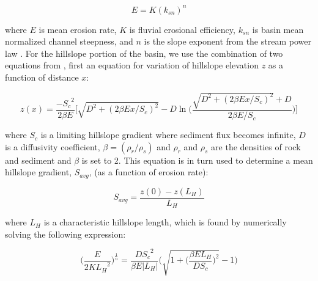 \begin{equation} \label{eq:EroK}
E=K(k_{sn})^{n}
\end{equation}

\noindent
where $E$ is mean erosion rate, $K$ is fluvial erosional efficiency, $k_{sn}$ is basin mean normalized channel steepness, and $n$ is the slope exponent from the stream power law \citep[e.g.,][]{Snyder2003,Ouimet2009}. For the hillslope portion of the basin, we use the combination of two equations from \cite{Roering2007}, first an equation for variation of hillslope elevation $z$ as a function of distance $x$:

\begin{equation}
z(x) = \frac{-{S_{c}}^{2}}{2\beta E}  \bigg[ \sqrt{D^{2} + (2\beta Ex / S_{c})^{2}} -D\ln\bigg( \frac{ \sqrt{D^{2} + (2\beta Ex / S_{c})^{2}} + D}{2\beta E/S_{c}} \bigg)   \bigg]
\end{equation}

\noindent
where $S_{c}$ is a limiting hillslope gradient where sediment flux becomes infinite, $D$ is a diffusivity coefficient, $\beta = (\rho_{r}/\rho_{s})$ and $\rho_{r}$ and $\rho_{s}$ are the densities of rock and sediment and $\beta$ is set to 2. This equation is in turn used to determine a mean hillslope gradient, $S_{avg}$, (as a function of erosion rate):

\begin{equation}
S_{avg}=\frac{z(0)-z(L_{H})}{L_{H}}
\end{equation}

\noindent where $L_{H}$ is a characteristic hillslope length, which is found by numerically solving the following expression:

\begin{equation}
\bigg(  \frac{E}{2K{L_{H}}^{2}}  \bigg)^{\frac{1}{n}} = \frac{D{S_{c}}^{2}}{\beta E |L_{H}|} \Bigg( \sqrt{1 + \bigg( \frac{\beta E L_{H}}{DS_{c}} \bigg)^{2} } - 1 \Bigg)
\end{equation}

